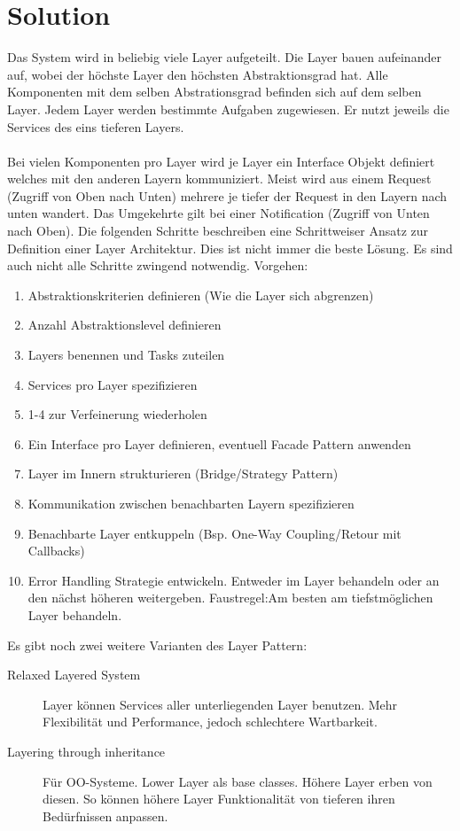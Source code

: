 \section{Solution}
Das System wird in beliebig viele Layer aufgeteilt. Die Layer bauen aufeinander auf, wobei der höchste Layer den höchsten Abstraktionsgrad hat. Alle Komponenten mit dem selben Abstrationsgrad befinden sich auf dem selben Layer. Jedem Layer werden bestimmte Aufgaben zugewiesen. Er nutzt jeweils die Services des eins tieferen Layers. \\\\
Bei vielen Komponenten pro Layer wird je Layer ein Interface Objekt definiert welches mit den anderen Layern kommuniziert. Meist wird aus einem Request (Zugriff von Oben nach Unten) mehrere je tiefer der Request in den Layern nach unten wandert. Das Umgekehrte gilt bei einer Notification (Zugriff von Unten nach Oben).
Die folgenden Schritte beschreiben eine Schrittweiser Ansatz zur Definition einer Layer Architektur. Dies ist nicht immer die beste Lösung. Es sind auch nicht alle Schritte zwingend notwendig. Vorgehen:
\begin{enumerate}
	\item Abstraktionskriterien definieren (Wie die Layer sich abgrenzen)
	\item Anzahl Abstraktionslevel definieren
	\item Layers benennen und Tasks zuteilen
	\item Services pro Layer spezifizieren
	\item 1-4 zur Verfeinerung wiederholen
	\item Ein Interface pro Layer definieren, eventuell Facade Pattern anwenden
	\item Layer im Innern strukturieren (Bridge/Strategy Pattern)
	\item Kommunikation zwischen benachbarten Layern spezifizieren
	\item Benachbarte Layer entkuppeln (Bsp. One-Way Coupling/Retour mit Callbacks)
	\item Error Handling Strategie entwickeln. Entweder im Layer behandeln oder an den nächst höheren weitergeben. Faustregel:Am besten am tiefstmöglichen Layer behandeln.
\end{enumerate}
Es gibt noch zwei weitere Varianten des Layer Pattern:
\begin{description}
	\item[Relaxed Layered System] Layer können Services aller unterliegenden Layer benutzen. Mehr Flexibilität und Performance, jedoch schlechtere Wartbarkeit.
	\item[Layering through inheritance] Für OO-Systeme. Lower Layer als base classes. Höhere Layer erben von diesen. So können höhere Layer Funktionalität von tieferen ihren Bedürfnissen anpassen.
\end{description}

